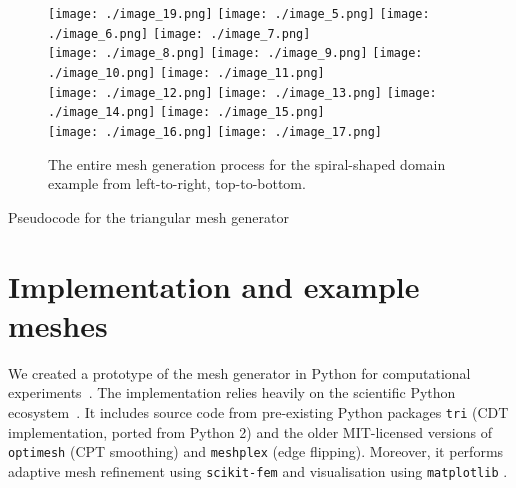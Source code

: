 \documentclass[11pt]{article}
\begin{document}
\begin{figure}[htbp]
  \centering
  \texttt{[image: ./image\_19.png]}
  \texttt{[image: ./image\_5.png]}
  \texttt{[image: ./image\_6.png]}
  \texttt{[image: ./image\_7.png]}\\
  \texttt{[image: ./image\_8.png]}
  \texttt{[image: ./image\_9.png]}
  \texttt{[image: ./image\_10.png]}
  \texttt{[image: ./image\_11.png]}\\
  \texttt{[image: ./image\_12.png]}
  \texttt{[image: ./image\_13.png]}
  \texttt{[image: ./image\_14.png]}
  \texttt{[image: ./image\_15.png]}\\
  \texttt{[image: ./image\_16.png]}
  \texttt{[image: ./image\_17.png]}
  \hspace{0.48\textwidth}
  \caption{The entire mesh generation process for the spiral-shaped domain
    example from left-to-right, top-to-bottom.}
\label{fig:spiralexample}
\end{figure}

\begin{algorithm}[H]
  \caption{Pseudocode for the triangular mesh generator}
  \label{alg:meshgen}
  \begin{algorithmic}[1]
    \Statex
    \EndFor
    \State {}
    \EndFunction
  \end{algorithmic}
\end{algorithm}


\section{Implementation and example meshes}

We created a prototype of the mesh generator in Python for computational
experiments~\cite{adaptmesh2020}.  The implementation relies heavily on the
scientific Python ecosystem~\cite{virtanen2020scipy}.  It includes source code
from pre-existing Python packages \verb|tri| \cite{tri} (CDT implementation,
ported from Python 2) and the older MIT-licensed versions of \verb|optimesh|
\cite{optimesh} (CPT smoothing) and \verb|meshplex| \cite{meshplex} (edge
flipping).  Moreover, it performs adaptive mesh refinement using
\verb|scikit-fem| \cite{gustafsson2020scikit} and visualisation using
\verb|matplotlib| \cite{hunter2007matplotlib}.
\end{document}
